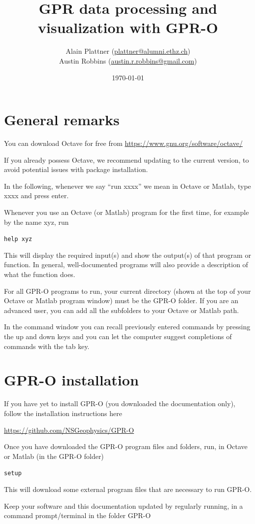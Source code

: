 \documentclass[11pt]{article}
\title{GPR data processing and visualization with GPR-O}
\author{Alain Plattner (\url{plattner@alumni.ethz.ch})\\Austin Robbins (\url{austin.r.robbins@gmail.com})}
\date{\today}
\begin{document}
\maketitle 
\tableofcontents
\section{General remarks}

You can download Octave for free from
\url{https://www.gnu.org/software/octave/}

If you already possess Octave, we recommend updating to the current version,
to avoid potential issues with package installation.

In the following, whenever we say ``run xxxx'' we mean in Octave or
Matlab, type xxxx and press enter.

Whenever you use an Octave (or Matlab) program for the first time, for
example by the name xyz, run
 
\qquad \verb#help xyz#
 
This will display the required input(s) and show the output(s) of that
program or function. In general, well-documented programs will also provide
a description of what the function does. 

For all GPR-O programs to run, your current directory (shown at the
top of your Octave or Matlab program window) must be the GPR-O
folder. If you are an advanced user, you can add all the subfolders to
your Octave or Matlab path.

In the command window you can recall previously entered commands by
pressing the up and down keys and you can let the computer suggest
completions of commands with the tab key.

\section{GPR-O installation}

If you have yet to install GPR-O (you downloaded the documentation only),
follow the installation instructions here

\url{https://github.com/NSGeophysics/GPR-O}

Once you have downloaded the GPR-O program files and folders, run, in
Octave or Matlab (in the GPR-O folder)

\qquad \verb#setup#

This will download some external program files that are necessary to
run GPR-O.

Keep your software and this documentation updated by regularly running, in a
command prompt/terminal in the folder GPR-O
\end{document}
